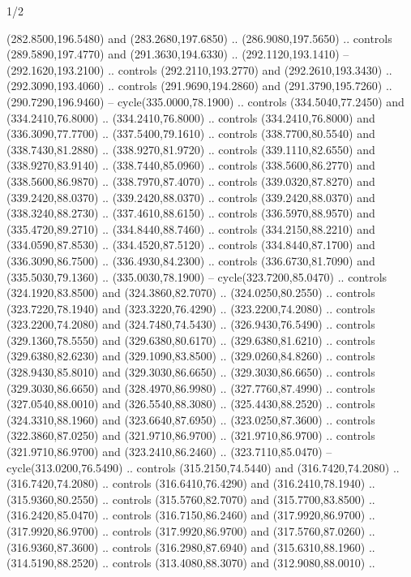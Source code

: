 \begin{flagdescription}{1/2}
\begin{scope}[xshift=0.5\flaglength]
\begin{scope}[scale=0.004\flagwidth,xshift=-90mm,yshift=89mm]
\begin{scope}[y=0.80pt, x=0.80pt, yscale=-1, xscale=1, inner sep=0pt, outer sep=0pt]
  (282.8500,196.5480) and (283.2680,197.6850) .. (286.9080,197.5650) .. controls
  (289.5890,197.4770) and (291.3630,194.6330) .. (292.1120,193.1410) --
  (292.1620,193.2100) .. controls (292.2110,193.2770) and (292.2610,193.3430) ..
  (292.3090,193.4060) .. controls (291.9690,194.2860) and (291.3790,195.7260) ..
  (290.7290,196.9460) -- cycle(335.0000,78.1900) .. controls (334.5040,77.2450)
  and (334.2410,76.8000) .. (334.2410,76.8000) .. controls (334.2410,76.8000)
  and (336.3090,77.7700) .. (337.5400,79.1610) .. controls (338.7700,80.5540)
  and (338.7430,81.2880) .. (338.9270,81.9720) .. controls (339.1110,82.6550)
  and (338.9270,83.9140) .. (338.7440,85.0960) .. controls (338.5600,86.2770)
  and (338.5600,86.9870) .. (338.7970,87.4070) .. controls (339.0320,87.8270)
  and (339.2420,88.0370) .. (339.2420,88.0370) .. controls (339.2420,88.0370)
  and (338.3240,88.2730) .. (337.4610,88.6150) .. controls (336.5970,88.9570)
  and (335.4720,89.2710) .. (334.8440,88.7460) .. controls (334.2150,88.2210)
  and (334.0590,87.8530) .. (334.4520,87.5120) .. controls (334.8440,87.1700)
  and (336.3090,86.7500) .. (336.4930,84.2300) .. controls (336.6730,81.7090)
  and (335.5030,79.1360) .. (335.0030,78.1900) -- cycle(323.7200,85.0470) ..
  controls (324.1920,83.8500) and (324.3860,82.7070) .. (324.0250,80.2550) ..
  controls (323.7220,78.1940) and (323.3220,76.4290) .. (323.2200,74.2080) ..
  controls (323.2200,74.2080) and (324.7480,74.5430) .. (326.9430,76.5490) ..
  controls (329.1360,78.5550) and (329.6380,80.6170) .. (329.6380,81.6210) ..
  controls (329.6380,82.6230) and (329.1090,83.8500) .. (329.0260,84.8260) ..
  controls (328.9430,85.8010) and (329.3030,86.6650) .. (329.3030,86.6650) ..
  controls (329.3030,86.6650) and (328.4970,86.9980) .. (327.7760,87.4990) ..
  controls (327.0540,88.0010) and (326.5540,88.3080) .. (325.4430,88.2520) ..
  controls (324.3310,88.1960) and (323.6640,87.6950) .. (323.0250,87.3600) ..
  controls (322.3860,87.0250) and (321.9710,86.9700) .. (321.9710,86.9700) ..
  controls (321.9710,86.9700) and (323.2410,86.2460) .. (323.7110,85.0470) --
  cycle(313.0200,76.5490) .. controls (315.2150,74.5440) and (316.7420,74.2080)
  .. (316.7420,74.2080) .. controls (316.6410,76.4290) and (316.2410,78.1940) ..
  (315.9360,80.2550) .. controls (315.5760,82.7070) and (315.7700,83.8500) ..
  (316.2420,85.0470) .. controls (316.7150,86.2460) and (317.9920,86.9700) ..
  (317.9920,86.9700) .. controls (317.9920,86.9700) and (317.5760,87.0260) ..
  (316.9360,87.3600) .. controls (316.2980,87.6940) and (315.6310,88.1960) ..
  (314.5190,88.2520) .. controls (313.4080,88.3070) and (312.9080,88.0010) ..

\end{scope}
\end{scope}
\end{scope}
\end{flagdescription}
